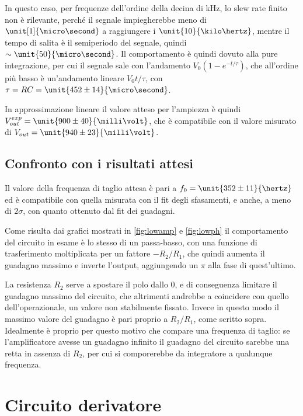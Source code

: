 \documentclass[10pt,a4paper]{article}
\begin{document}
In questo caso, per frequenze dell'ordine della decina di kHz, lo slew rate finito non è rilevante, perché il segnale impiegherebbe meno di $\unit[1]{\micro\second}$ a raggiungere i  $\unit{10}{\kilo\hertz}$, mentre il tempo di salita è il semiperiodo del segnale, quindi $\sim \unit{50}{\micro\second}$. Il comportamento è quindi dovuto alla pure integrazione, per cui il segnale sale con l'andamento $V_0(1 - e^{-t/\tau})$, che all'ordine più basso è un'andamento lineare $V_0 t/\tau$, con $\tau = R C = \unit{452 \pm 14}{\micro\second}$.

In approssimazione lineare il valore atteso per l'ampiezza è quindi $V_{out}^{exp} = \unit{900 \pm 40}{\milli\volt}$, che è compatibile con il valore misurato di $V_{out} = \unit{940 \pm 23}{\milli\volt}$.


\subsection{Confronto con i risultati attesi}

Il valore della frequenza di taglio attesa è pari a $f_0 = \unit{352 \pm 11}{\hertz}$ ed è compatibile con quella misurata con il fit degli sfasamenti, e anche, a meno di $2\sigma$, con quanto ottenuto dal fit dei guadagni.

Come risulta dai grafici mostrati in \figurename{\ref{fig:lowamp}} e \figurename{\ref{fig:lowph}} il comportamento del circuito in esame è lo stesso di un passa-basso, con una funzione di trasferimento moltiplicata per un fattore $-R_2/R_1$, che quindi aumenta il guadagno massimo e inverte l'output, aggiungendo un $\pi$ alla fase di quest'ultimo.

La resistenza $R_2$ serve a spostare il polo dallo 0, e di conseguenza limitare il guadagno massimo del circuito, che altrimenti andrebbe a coincidere con quello dell'operazionale, un valore non stabilmente fissato. Invece in questo modo il massimo valore del guadagno è pari proprio a  $R_2/R_1$, come scritto sopra.
Idealmente è proprio per questo motivo che compare una frequenza di taglio: se l'amplificatore avesse un guadagno infinito il guadagno del circuito sarebbe una retta in assenza di $R_2$, per cui si comporerebbe da integratore a qualunque frequenza.

\section{Circuito derivatore}
\end{document}
